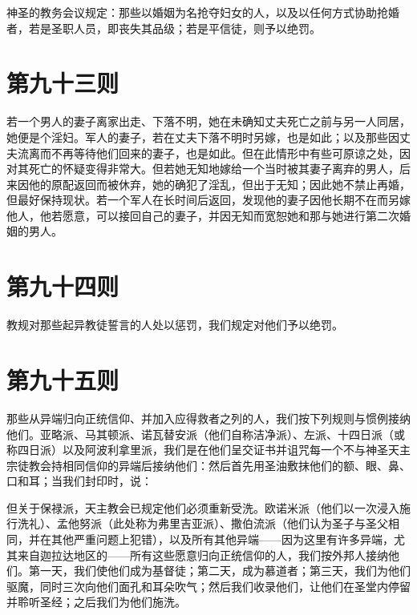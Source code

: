 神圣的教务会议规定：那些以婚姻为名抢夺妇女的人，以及以任何方式协助抢婚者，若是圣职人员，即丧失其品级；若是平信徒，则予以绝罚。\par


\section{第九十三则}

若一个男人的妻子离家出走、下落不明，她在未确知丈夫死亡之前与另一人同居，她便是个淫妇。军人的妻子，若在丈夫下落不明时另嫁，也是如此；以及那些因丈夫流离而不再等待他们回来的妻子，也是如此。但在此情形中有些可原谅之处，因对其死亡的怀疑变得非常大。但若她无知地嫁给一个当时被其妻子离弃的男人，后来因他的原配返回而被休弃，她的确犯了淫乱，但出于无知；因此她不禁止再婚，但最好保持现状。若一个军人在长时间后返回，发现他的妻子因他长期不在而另嫁他人，他若愿意，可以接回自己的妻子，并因无知而宽恕她和那与她进行第二次婚姻的男人。\par


\section{第九十四则}

教规对那些起异教徒誓言的人处以惩罚，我们规定对他们予以绝罚。\par


\section{第九十五则}

那些从异端归向正统信仰、并加入应得救者之列的人，我们按下列规则与惯例接纳他们。亚略派、马其顿派、诺瓦替安派（他们自称洁净派）、左派、十四日派（或称四日派）以及阿波利拿里派，我们是在他们呈交证书并诅咒每一个不与神圣天主宗徒教会持相同信仰的异端后接纳他们：然后首先用圣油敷抹他们的额、眼、鼻、口和耳；当我们封印时，说：\par

但关于保禄派，天主教会已规定他们必须重新受洗。欧诺米派（他们以一次浸入施行洗礼）、孟他努派（此处称为弗里吉亚派）、撒伯流派（他们认为圣子与圣父相同，并在其他严重问题上犯错），以及所有其他异端——因为这里有许多异端，尤其来自迦拉达地区的——所有这些愿意归向正统信仰的人，我们按外邦人接纳他们。第一天，我们使他们成为基督徒；第二天，成为慕道者；第三天，我们为他们驱魔，同时三次向他们面孔和耳朵吹气；然后我们收录他们，让他们在圣堂内停留并聆听圣经；之后我们为他们施洗。\par

